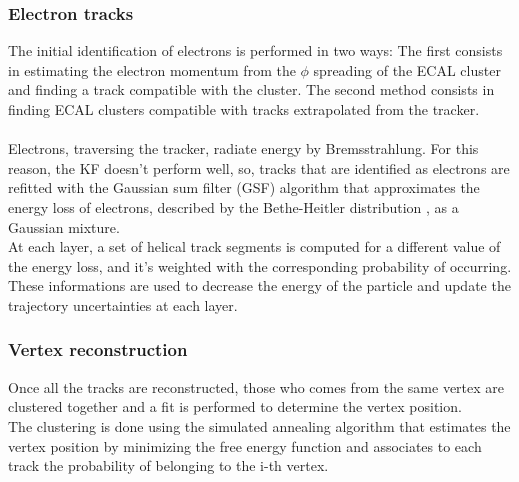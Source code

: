 \subsubsection*{Electron tracks}
The initial identification of electrons is performed in two ways:
The first consists in estimating the electron momentum from the $\phi$ spreading of the ECAL cluster and finding a track compatible with the cluster.
The second method consists in finding ECAL clusters compatible with tracks extrapolated  from the tracker.\\
\\
Electrons, traversing the tracker, radiate energy by Bremsstrahlung. For this reason, the KF doesn't perform well, so, tracks that are identified as electrons are refitted with the Gaussian sum filter (GSF) algorithm that approximates the energy loss of electrons, described by the Bethe-Heitler distribution \ADDREF, as a Gaussian mixture.\\
At each layer, a set of helical track segments is computed for a different value of the energy loss, and it's weighted with the corresponding probability of occurring. These informations are used to decrease the energy of the particle and update the trajectory uncertainties at each layer.
\subsubsection*{Vertex reconstruction}
Once all the tracks are reconstructed, those who comes from the same vertex are clustered together and a fit is performed to determine the vertex position.\\
The clustering is done using the simulated annealing algorithm \ADDREF that estimates the vertex position by minimizing the free energy function and associates to each track the probability of belonging to the i-th vertex. \\

